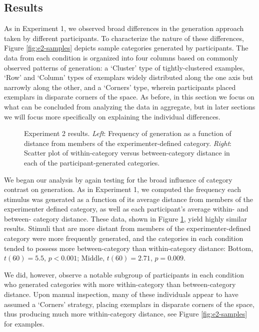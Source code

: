 \documentclass[12pt]{article}
\newcommand\inputpgf[2]{{
\let\pgfimageWithoutPath\pgfimage
\renewcommand{\pgfimage}[2][]{\pgfimageWithoutPath[##1]{#1/##2}}

}}
\begin{document}
\begin{flushleft}
\subsection{Results}

As in Experiment 1, we observed broad differences in the generation approach taken by different participants.  To characterize the nature of these differences, Figure \ref{fig:e2-samples} depicts sample categories generated by participants. The data from each condition is organized into four columns based on commonly observed patterns of generation: a `Cluster' type of tightly-clustered examples,   `Row' and `Column' types of exemplars widely distributed along the one axis but narrowly along the other, and a `Corners' type, wherein participants placed exemplars in disparate corners of the space. As before, in this section we focus on what can be concluded from analyzing the data in aggregate, but in later sections we will focus more specifically on explaining the individual differences.

\begin{figure}
    \begin{center}
    \inputpgf{figs/}{e2-distanceplots.pgf}
    \caption{Experiment 2 results. {\em Left}: Frequency of generation as a function of distance from members of the experimenter-defined category. {\em Right}: Scatter plot of within-category versus between-category distance in each of the participant-generated categories.}
    \label{fig:e2-distanceplots}
    \end{center}
\end{figure}

We began our analysis by again testing for the broad influence of category contrast on generation. As in Experiment 1, we computed the frequency each stimulus was generated as a function of its average distance from members of the experimenter defined category, as well as each participant's average within- and between- category distance. These data, shown in Figure \ref{fig:e2-distanceplots}, yield highly similar results. Stimuli that are more distant from members of the experimenter-defined category were more frequently generated, and the categories in each condition tended to possess more between-category than within-category distance: Bottom, $t(60) = 5.5$, $p < 0.001$; Middle, $t(60) = 2.71$, $p = 0.009$. 

We did, however, observe a notable subgroup of participants in each condition who generated categories with more within-category than between-category distance. Upon manual inspection, many of these individuals appear to have assumed a `Corners' strategy, placing exemplars in disparate corners of the space, thus producing much more within-category distance, see Figure \ref{fig:e2-samples} for examples.


\end{flushleft}
\end{document}
